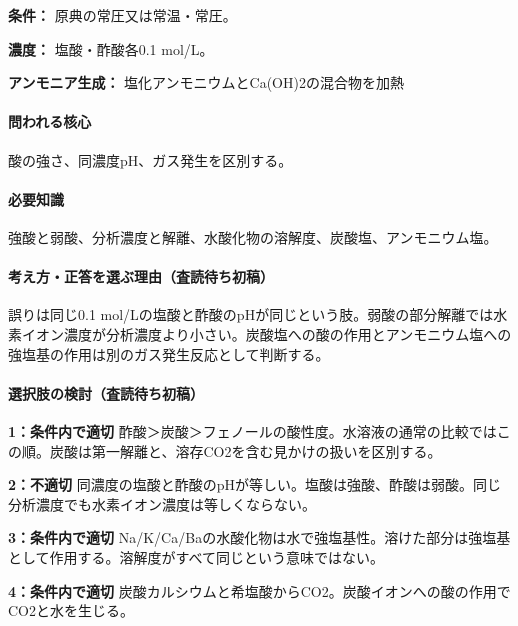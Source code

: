 \noindent\textbf{条件：} 原典の常圧又は常温・常圧。\par

\noindent\textbf{濃度：} 塩酸・酢酸各0.1 mol/L。\par

\noindent\textbf{アンモニア生成：} 塩化アンモニウムとCa(OH)2の混合物を加熱\par

\paragraph{問われる核心} 酸の強さ、同濃度pH、ガス発生を区別する。

\paragraph{必要知識} 強酸と弱酸、分析濃度と解離、水酸化物の溶解度、炭酸塩、アンモニウム塩。

\paragraph{考え方・正答を選ぶ理由（査読待ち初稿）} 誤りは同じ0.1 mol/Lの塩酸と酢酸のpHが同じという肢。弱酸の部分解離では水素イオン濃度が分析濃度より小さい。炭酸塩への酸の作用とアンモニウム塩への強塩基の作用は別のガス発生反応として判断する。

\paragraph{選択肢の検討（査読待ち初稿）}\mbox{}\par

\noindent\textbf{1：条件内で適切} 酢酸＞炭酸＞フェノールの酸性度。水溶液の通常の比較ではこの順。炭酸は第一解離と、溶存CO2を含む見かけの扱いを区別する。\par

\noindent\textbf{2：不適切} 同濃度の塩酸と酢酸のpHが等しい。塩酸は強酸、酢酸は弱酸。同じ分析濃度でも水素イオン濃度は等しくならない。\par

\noindent\textbf{3：条件内で適切} Na/K/Ca/Baの水酸化物は水で強塩基性。溶けた部分は強塩基として作用する。溶解度がすべて同じという意味ではない。\par

\noindent\textbf{4：条件内で適切} 炭酸カルシウムと希塩酸からCO2。炭酸イオンへの酸の作用でCO2と水を生じる。\par


